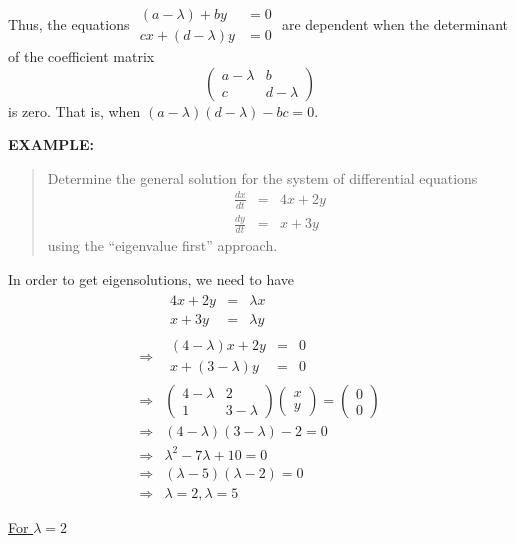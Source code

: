 Thus, the equations $\begin{matrix}
(a-\lambda)+by &=0\\ cx+(d-\lambda)y &=0 \end{matrix}$  are dependent when the determinant of the coefficient matrix  \[\begin{pmatrix}
a-\lambda &b\\ c& d-\lambda
\end{pmatrix}\] is zero. That is, when  $(a-\lambda)(d-\lambda)-bc=0$. 

\textbf{EXAMPLE:}
\begin{quote}
Determine the general solution for the system of differential equations 
\[\begin{matrix} \frac{dx}{dt}&=&4x+2y \\\frac{dy}{dt}&=& x+3y  \end{matrix}
\]using the ``eigenvalue first'' approach. 
\end{quote}

In order to get eigensolutions, we need to have 
\begin{align*}
&\begin{matrix} 4x+2y &=& \lambda x \\x+3y  &=& \lambda y  \end{matrix}\\
\Rightarrow & \begin{matrix} (4-\lambda)x+2y &=& 0 \\x+(3-\lambda)y  &=& 0 \end{matrix}\\
\Rightarrow	& \begin{pmatrix}
4-\lambda &2\\ 1& 3-\lambda
\end{pmatrix}\begin{pmatrix}x\\y\end{pmatrix} = \begin{pmatrix}
0\\0
\end{pmatrix}\\
\Rightarrow & (4-\lambda)(3-\lambda)-2=0\\
\Rightarrow & \lambda^2-7\lambda+10=0\\
\Rightarrow & (\lambda-5)(\lambda-2)=0\\
\mathbb{} \Rightarrow & \lambda=2, \lambda=5
\end{align*}
           
\underline{For $\lambda = 2$}


